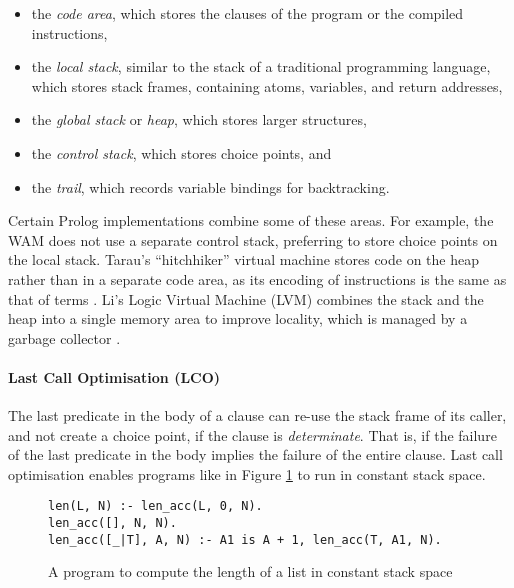 \begin{itemize}
\item the \emph{code area}, which stores the clauses of the program or the compiled instructions,
\item the \emph{local stack}, similar to the stack of a traditional programming language, which stores stack frames, containing atoms, variables, and return addresses,
\item the \emph{global stack} or \emph{heap}, which stores larger structures,
\item the \emph{control stack}, which stores choice points, and
\item the \emph{trail}, which records variable bindings for backtracking.
\end{itemize}

Certain Prolog implementations combine some of these areas. For example, the WAM does not use a separate control stack, preferring to store choice points on the local stack. Tarau's ``hitchhiker'' virtual machine stores code on the heap rather than in a separate code area, as its encoding of instructions is the same as that of terms \cite{tarauHitchhikersGuideReinventing2018}. Li's Logic Virtual Machine (LVM) combines the stack and the heap into a single memory area to improve locality, which is managed by a garbage collector \cite{liEfficientMemoryManagement2000}.

\paragraph{Last Call Optimisation (LCO)} The last predicate in the body of a clause can re-use the stack frame of its caller, and not create a choice point, if the clause is \emph{determinate}. That is, if the failure of the last predicate in the body implies the failure of the entire clause. Last call optimisation enables programs like in Figure \ref{fig:lco} to run in constant stack space.

\begin{figure}[H]
\begin{center}
\begin{verbatim}
len(L, N) :- len_acc(L, 0, N).
len_acc([], N, N).
len_acc([_|T], A, N) :- A1 is A + 1, len_acc(T, A1, N).
\end{verbatim}
\end{center}
\caption{A program to compute the length of a list in constant stack space}
\label{fig:lco}
\end{figure}

